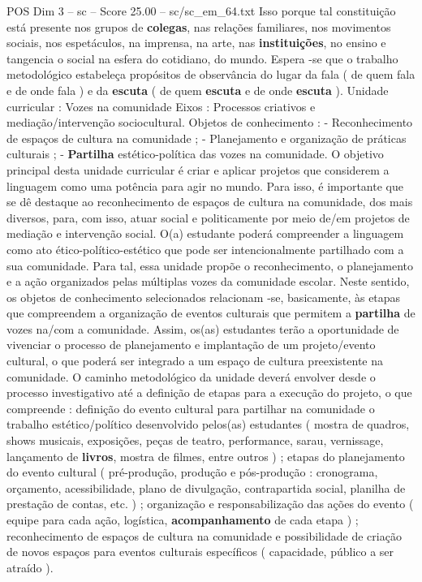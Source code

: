\begin{textsample}{POS Dim 3 – sc – Score 25.00 – sc/sc\_em\_64.txt}
Isso porque tal constituição está presente nos grupos de \textbf{colegas}, nas relações familiares, nos movimentos sociais, nos espetáculos, na imprensa, na arte, nas \textbf{instituições}, no ensino e tangencia o social na esfera do cotidiano, do mundo.
Espera -se que o trabalho metodológico estabeleça propósitos de observância do lugar da fala ( de quem fala e de onde fala ) e da \textbf{escuta} ( de quem \textbf{escuta} e de onde \textbf{escuta} ).
Unidade curricular : Vozes na comunidade Eixos : Processos criativos e mediação/intervenção sociocultural.
Objetos de conhecimento : - Reconhecimento de espaços de cultura na comunidade ; - Planejamento e organização de práticas culturais ; - \textbf{Partilha} estético-política das vozes na comunidade.
O objetivo principal desta unidade curricular é criar e aplicar projetos que considerem a linguagem como uma potência para agir no mundo.
Para isso, é importante que se dê destaque ao reconhecimento de espaços de cultura na comunidade, dos mais diversos, para, com isso, atuar social e politicamente por meio de/em projetos de mediação e intervenção social.
O(a) estudante poderá compreender a linguagem como ato ético-político-estético que pode ser intencionalmente partilhado com a sua comunidade.
Para tal, essa unidade propõe o reconhecimento, o planejamento e a ação organizados pelas múltiplas vozes da comunidade escolar.
Neste sentido, os objetos de conhecimento selecionados relacionam -se, basicamente, às etapas que compreendem a organização de eventos culturais que permitem a \textbf{partilha} de vozes na/com a comunidade.
Assim, os(as) estudantes terão a oportunidade de vivenciar o processo de planejamento e implantação de um projeto/evento cultural, o que poderá ser integrado a um espaço de cultura preexistente na comunidade.
O caminho metodológico da unidade deverá envolver desde o processo investigativo até a definição de etapas para a execução do projeto, o que compreende : definição do evento cultural para partilhar na comunidade o trabalho estético/político desenvolvido pelos(as) estudantes ( mostra de quadros, shows musicais, exposições, peças de teatro, performance, sarau, vernissage, lançamento de \textbf{livros}, mostra de filmes, entre outros ) ; etapas do planejamento do evento cultural ( pré-produção, produção e pós-produção : cronograma, orçamento, acessibilidade, plano de divulgação, contrapartida social, planilha de prestação de contas, etc. ) ; organização e responsabilização das ações do evento ( equipe para cada ação, logística, \textbf{acompanhamento} de cada etapa ) ; reconhecimento de espaços de cultura na comunidade e possibilidade de criação de novos espaços para eventos culturais específicos ( capacidade, público a ser atraído ).

\end{textsample}
